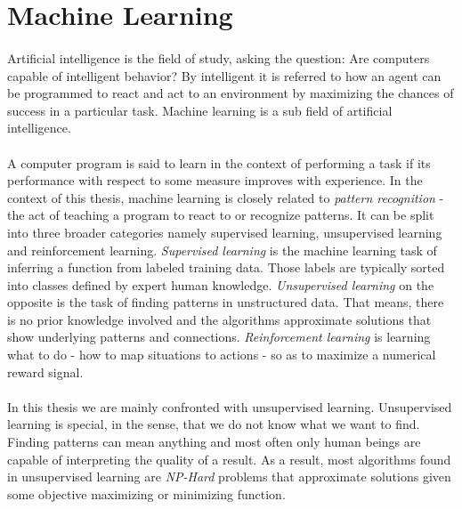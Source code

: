 \section{Machine Learning}
\label{sec:ml_intro}
  \paragraph{} Artificial intelligence is the field of study, asking the question: Are computers capable of intelligent behavior? By intelligent it is referred to how an agent can be programmed to react and act to an environment by maximizing the chances of success in a particular task. Machine learning is a sub field of artificial intelligence.

  \paragraph{} A computer program is said to learn in the context of performing a task if its performance with respect to some measure improves with experience. In the context of this thesis, machine learning is closely related to \emph{pattern recognition} - the act of teaching a program to react to or recognize patterns. It can be split into three broader categories namely supervised learning, unsupervised learning and reinforcement learning. \emph{Supervised learning} is the machine learning task of inferring a function from labeled training data. Those labels are typically sorted into classes defined by expert human knowledge. \emph{Unsupervised learning} on the opposite is the task of finding patterns in unstructured data. That means, there is no prior knowledge involved and the algorithms approximate solutions that show underlying patterns and connections. \emph{Reinforcement learning} is learning what to do - how to map situations to actions - so as to maximize a numerical reward signal.

  \paragraph{} In this thesis we are mainly confronted with unsupervised learning. Unsupervised learning is special, in the sense, that we do not know what we want to find. Finding patterns can mean anything and most often only human beings are capable of interpreting the quality of a result. As a result, most algorithms found in unsupervised learning are \emph{NP-Hard} problems that approximate solutions given some objective maximizing or minimizing function.

